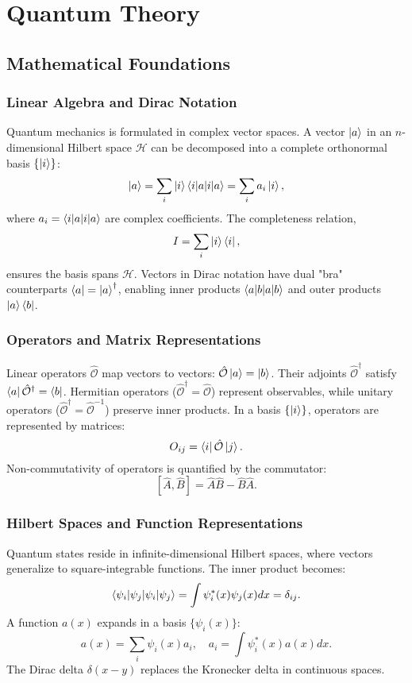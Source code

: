 \graphicspath{{../results/figures/theory/}}
\chapter{Quantum Theory}
\label{sec:theory}

\section{Mathematical Foundations}
\subsection{Linear Algebra and Dirac Notation}
Quantum mechanics is formulated in complex vector spaces. A vector \(\ket{a}\) in an \(n\)-dimensional Hilbert space \(\mathcal{H}\) can be decomposed into a complete orthonormal basis \(\{\ket{i}\}\):  
\[
\ket{a} = \sum_i \ket{i}\braket{i|a} = \sum_i a_i \ket{i},
\]
where \(a_i = \braket{i|a}\) are complex coefficients. The completeness relation,  
\[
I = \sum_i \ket{i}\bra{i},
\]
ensures the basis spans \(\mathcal{H}\). Vectors in Dirac notation have dual "bra" counterparts \(\bra{a} = \ket{a}^\dagger\), enabling inner products \(\braket{a|b}\) and outer products \(\ket{a}\bra{b}\).

\subsection{Operators and Matrix Representations}
Linear operators \(\hat{\mathcal{O}}\) map vectors to vectors: \(\hat{\mathcal{O}}\ket{a} = \ket{b}\). Their adjoints \(\hat{\mathcal{O}}^\dagger\) satisfy \(\bra{a}\hat{\mathcal{O}}^\dagger = \bra{b}\). Hermitian operators (\(\hat{\mathcal{O}}^\dagger = \hat{\mathcal{O}}\)) represent observables, while unitary operators (\(\hat{\mathcal{O}}^\dagger = \hat{\mathcal{O}}^{-1}\)) preserve inner products. In a basis \(\{\ket{i}\}\), operators are represented by matrices:  
\[
O_{ij} = \bra{i}\hat{\mathcal{O}}\ket{j}.
\]
Non-commutativity of operators is quantified by the commutator:  
\[
[\hat{A}, \hat{B}] = \hat{A}\hat{B} - \hat{B}\hat{A}.
\]

\subsection{Hilbert Spaces and Function Representations}
Quantum states reside in infinite-dimensional Hilbert spaces, where vectors generalize to square-integrable functions. The inner product becomes:  
\[
\braket{\psi_i|\psi_j} = \int \psi_i^*(x)\psi_j(x) dx = \delta_{ij}.
\]
A function \(a(x)\) expands in a basis \(\{\psi_i(x)\}\):  
\[
a(x) = \sum_i \psi_i(x) a_i, \quad a_i = \int \psi_i^*(x)a(x) dx.
\]
The Dirac delta \(\delta(x-y)\) replaces the Kronecker delta in continuous spaces.

